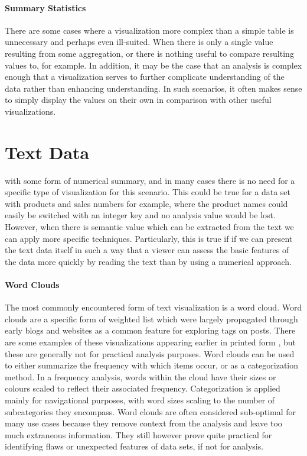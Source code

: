 \paragraph{Summary Statistics}
There are some cases where a visualization more complex than a simple table is unnecessary and perhaps even ill-suited. When there is only a single value resulting from some aggregation, or there is nothing useful to compare resulting values to, for example. In addition, it may be the case that an analysis is complex enough that a visualization serves to further complicate understanding of the data rather than enhancing understanding. In such scenarios, it often makes sense to simply display the values on their own in comparison with other useful visualizations.


\section{Text Data}
\label{sec:text_data}
 with some form of numerical summary, and in many cases there is no need for a specific type of visualization for this scenario. This could be true for a data set with products and sales numbers for example, where the product names could easily be switched with an integer key and no analysis value would be lost. However, when there is semantic value which can be extracted from the text we can apply more specific techniques. Particularly, this is true if if we can present the text data itself in such a way that a viewer can assess the basic features of the data more quickly by reading the text than by using a numerical approach.

\paragraph{Word Clouds}
The most commonly encountered form of text visualization is a word cloud. Word clouds are a specific form of weighted list which were largely propagated through early blogs and websites as a common feature for exploring tags on posts. There are some examples of these visualizations appearing earlier in printed form \citep{Deleuze1987}, but these are generally not for practical analysis purposes. Word clouds can be used to either summarize the frequency with which items occur, or as a categorization method. In a frequency analysis, words within the cloud have their sizes or colours scaled to reflect their associated frequency. Categorization is applied mainly for navigational purposes, with word sizes scaling to the number of subcategories they encompass. Word clouds are often considered sub-optimal for many use cases because they remove context from the analysis and leave too much extraneous information. They still however prove quite practical for identifying flaws or unexpected features of data sets, if not for analysis. 

